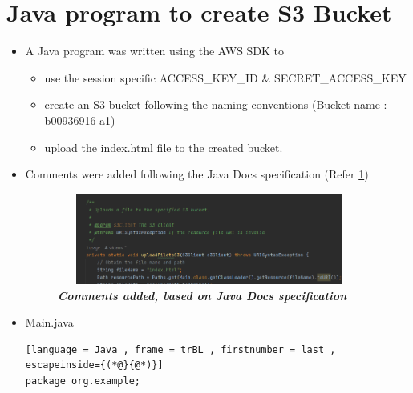 \section{Java program to create S3 Bucket}
\begin{itemize}
  \item A Java program was written using the AWS SDK  to
        \begin{itemize}
          \item use the session specific ACCESS\_KEY\_ID \& SECRET\_ACCESS\_KEY
          \item create an S3 bucket following the naming conventions (Bucket name : b00936916-a1)
          \item upload the index.html file to the created bucket.
        \end{itemize}
  \item Comments were added following the Java Docs specification (Refer \ref{fig:javaDocs})
        \begin{figure}[htp]
          \centering
          \includegraphics[scale=1, width=10cm,height=3cm]{PROBLEM 2/Snaps/1. Java docs specs.png}
          \caption{\textbf{\textit{Comments added, based on Java Docs specification}}}
          \label{fig:javaDocs}
        \end{figure}
    \item Main.java
   

\begin{lstlisting}[language = Java , frame = trBL , firstnumber = last , escapeinside={(*@}{@*)}]
package org.example;


\end{lstlisting}
\end{itemize}
